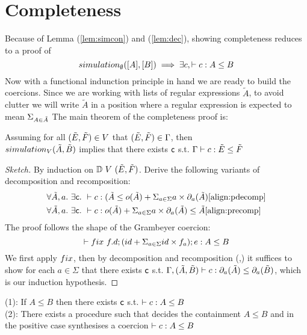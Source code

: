 \documentclass[a4paper,UKenglish,cleveref, autoref, thm-restate]{lipics-v2021}
\newcommand\mycomment[1]{}
\begin{document}
\section{Completeness}
Because of Lemma (\ref{lem:simcon}) and (\ref{lem:dec}), showing completeness reduces to a proof of
\[ \simulationb{\emptyset}{[A]}{[B]} \implies \exists c, \contains{}{c}{A}{B} \]
Now with a functional indunction principle in hand we are ready to build the coercions. Since we are working with lists of regular expressions $\tilde{A}$, to avoid clutter we will write $\tilde{A}$ in a position where a regular expression is expected to mean $\Sigma_{A \in \tilde{A}}$ The main theorem of the completeness proof is:
\begin{theorem}
Assuming for all $(\tilde{E},\tilde{F}) \in V$ that $(\tilde{E},\tilde{F}) \in \Gamma$, then\\
$\simulationb{V}{\tilde{A}}{\tilde{B}}$ implies that there exists $\textsf{c}$ s.t. $\contains{\Gamma}{c}{\tilde{E}}{\tilde{F}}$
\end{theorem}
\begin{proof}[Sketch]
By induction on $\mathbb{D}~{V}~(\tilde{E},\tilde{F})$. Derive the following variants of decomposition and recomposition:
\begin{align}
&\forall \tilde{A},a.~\exists \dslcom{c}.~\contains{}{c}{(\tilde{A}}{\myo{\tilde{A}} + \Sigma_{a \in \Sigma} a \times \mypar{a}{\tilde{A}}} \ref{align:pdecomp}\\
&\forall \tilde{A},a.~\exists \dslcom{c}.~\contains{}{c}
{\myo{\tilde{A}} + \Sigma_{a \in \Sigma} a \times \mypar{a}{\tilde{A}}}
{\tilde{A}} \ref{align:precomp}
\end{align}
The proof follows the shape of the Grambeyer coercion:
\[\contains{}{\fix ~f.d;(id + \Sigma_{a \in \Sigma} id\times f_a); e}{A}{B}\]
We first apply $\fix$, then by decomposition and recomposition (\label{align:pdecomp},\label{align:precomp}) it suffices to show for each $a \in \Sigma$ that there exists $\textsf{c}$ s.t. $\contains{\Gamma,\pder{A}{B}}{c}{\mypar{a}{\tilde{A}}}{\mypar{a}{\tilde{B}}}$, which is our induction hypothesis.
\end{proof}
\begin{corollary}
\mycomment{Mention this is compact decision procedure for equivalence, point to file}
(1): If $A \leq B$ then there exists $\textsf{c}$ s.t. $\contains{}{c}{A}{B}$\\
(2): There exists a procedure such that decides the containment $ A \leq B$ and in the positive case synthesises a coercion $\contains{}{c}{A}{B}$
\end{corollary}
\end{document}
